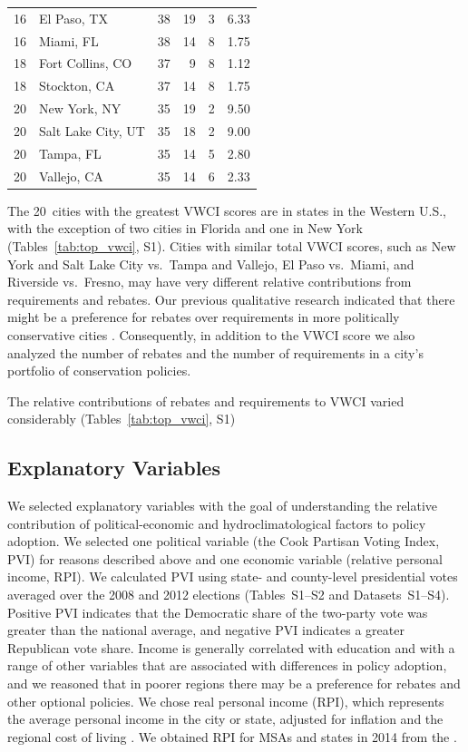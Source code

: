 \documentclass[draft,linenumbers]{agujournal}\usepackage{knitr}
\begin{document}
\begin{table}[tbp]
\begin{tabular}{rlrrrr}
   16 & El Paso, TX &  38 &  19 &   3 & 6.33 \\ 
   16 & Miami, FL &  38 &  14 &   8 & 1.75 \\ 
   18 & Fort Collins, CO &  37 &   9 &   8 & 1.12 \\ 
   18 & Stockton, CA &  37 &  14 &   8 & 1.75 \\ 
   20 & New York, NY &  35 &  19 &   2 & 9.50 \\ 
   20 & Salt Lake City, UT &  35 &  18 &   2 & 9.00 \\ 
   20 & Tampa, FL &  35 &  14 &   5 & 2.80 \\ 
   20 & Vallejo, CA &  35 &  14 &   6 & 2.33 \\ 
   \hline
\end{tabular}
\end{table}

The 20~cities with the greatest VWCI scores are in states in the
Western U.S., with the exception of two cities in Florida and one in New York
(Tables~\ref{tab:top_vwci}, S1). Cities with similar total VWCI scores, such as
New York and Salt Lake City vs.\ Tampa and Vallejo, El Paso vs.\ Miami, and
Riverside vs.\ Fresno, may have very different relative contributions from
requirements and rebates.
Our previous qualitative research
indicated that there might be a preference for rebates over requirements in more
politically conservative cities \citep{hess:drought:2016,brown:politics:2016}.
Consequently, in addition to the VWCI score we also analyzed the number of
rebates and the number of requirements in a city's portfolio of conservation
policies.

The relative contributions of rebates and requirements to VWCI varied
considerably (Tables~\ref{tab:top_vwci}, S1)

\subsection{Explanatory Variables}
We selected explanatory variables with the goal of understanding the
relative contribution of political-economic and hydroclimatological factors
to policy adoption.
We selected one political variable (the Cook Partisan Voting Index, PVI) for reasons
described above and one economic variable (relative personal income, RPI).
We calculated PVI using state- and county-level presidential votes averaged over the
2008 and 2012 elections \citep{cook:pvi:2013,cq:elections:2016}
(Tables~S1--S2 and Datasets~S1--S4).
Positive PVI indicates that the Democratic share of the two-party vote was greater
than the national average, and negative PVI indicates a greater Republican vote share.
Income is generally correlated with education and with a range of other variables that
are associated with differences in policy adoption, and we reasoned that in poorer
regions there may be a preference for rebates and other optional policies.
We chose real personal income (RPI), which represents the average personal income in the city
or state, adjusted for inflation and the regional cost of living
\citep{bea:rpp.methodology:2016}.
We obtained RPI for MSAs and states in 2014 from the
\citet{bea:rpi:2016}.
\end{document}
